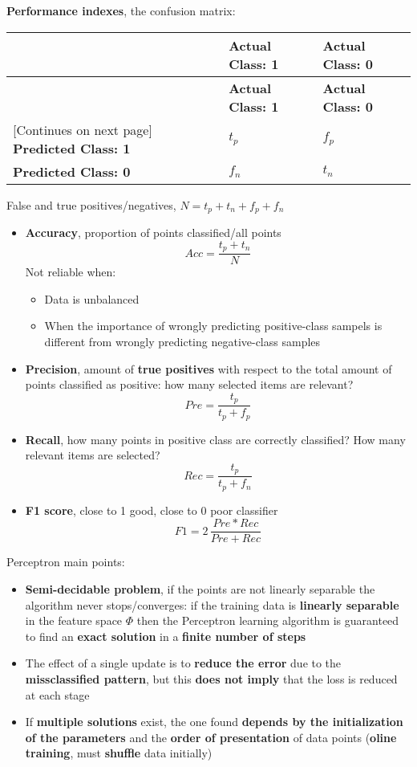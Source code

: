     \textbf{Performance indexes}, the confusion matrix:
    \begin{tabularx}{\linewidth}{X|X|X}
        \toprule
        \textbf{} & \textbf{Actual Class: 1} & \textbf{Actual Class: 0}\\
        \midrule
        \endfirsthead
        \toprule
        \textbf{} & \textbf{Actual Class: 1} & \textbf{Actual Class: 0}\\
        \midrule
        \endhead
        \footnotesize [Continues on next page]
        \endfoot
        \bottomrule
        \endlastfoot
        \textbf{Predicted Class: 1} & $t_p$ & $f_p$\\ \midrule
        \textbf{Predicted Class: 0} & $f_n$ & $t_n$
    \end{tabularx}
    False and true positives/negatives, $N=t_p+t_n+f_p+f_n$
    \begin{itemize}
        \item \textbf{Accuracy}, proportion of points classified/all points
        $$Acc=\frac{t_p+t_n}{N}$$
        Not reliable when:
        \begin{itemize}
            \item Data is unbalanced
            \item When the importance of wrongly predicting positive-class sampels is different from wrongly predicting negative-class samples
        \end{itemize}
        \item \textbf{Precision}, amount of \textbf{true positives} with respect to the total amount of points classified as positive: how many selected items are relevant?
        $$Pre=\frac{t_p}{t_p+f_p}$$
        \item \textbf{Recall}, how many points in positive class are correctly classified? How many relevant items are selected?
        $$Rec=\frac{t_p}{t_p+f_n}$$
        \item \textbf{F1 score}, close to 1 good, close to 0 poor classifier
        $$F1=2\,\frac{Pre*Rec}{Pre+Rec}$$
    \end{itemize}
    Perceptron main points:
    \begin{itemize}
        \item \textbf{Semi-decidable problem}, if the points are not linearly separable the algorithm never stops/converges: if the training data is \textbf{linearly separable} in the feature space $\Phi$ then the Perceptron learning algorithm is guaranteed to find an \textbf{exact solution} in a \textbf{finite number of steps}
        \item The effect of a single update is to \textbf{reduce the error} due to the \textbf{missclassified pattern}, but this \textbf{does not imply} that the loss is reduced at each stage
        \item If \textbf{multiple solutions} exist, the one found \textbf{depends by the initialization of the parameters} and the \textbf{order of presentation} of data points (\textbf{oline training}, must \textbf{shuffle} data initially)
    \end{itemize}


